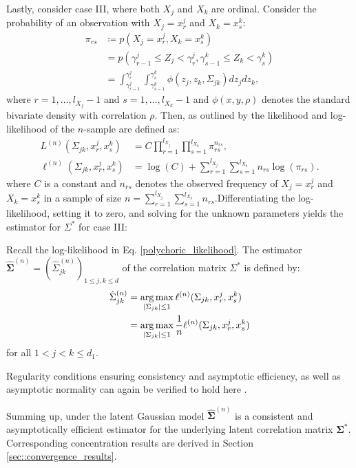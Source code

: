 Lastly, consider case III, where both $X_j$ and $X_k$ are ordinal. Consider the probability of an observation with $X_j = x_r^j$ and $X_k = x_s^k$:
\begin{equation}\label{cell_probabilities}
    \begin{split}
        \pi_{rs} &\coloneqq p(X_j = x_r^j, X_k = x_s^k) \\
        &= p(\gamma^j_{r-1} \leq Z_j < \gamma^j_r, \gamma^k_{s-1} \leq Z_k < \gamma^k_s) \\
        &= \int_{\gamma^j_{r-1}}^{\gamma^j_{r}} \int_{\gamma^k_{s-1}}^{\gamma^k_{s}} \phi(z_j,z_k,\Sigma_{jk}) dz_j dz_k,
    \end{split}
\end{equation}
where $r = 1, \dots, l_{X_j}-1$ and $s = 1, \dots, l_{X_k}-1$ and $\phi(x,y,\rho)$ denotes the standard bivariate density with correlation $\rho$. Then, as outlined by \citet{Olsson79} the likelihood and log-likelihood of the $n$-sample are defined as:
\begin{equation}\label{polychoric_likelihood}
    \begin{split}
        L^{(n)}(\Sigma_{jk}, x^j_r,x^k_s) &= C \prod_{r=1}^{l_{X_{j}}} \prod_{s=1}^{l_{X_{k}}} \pi_{rs}^{n_{rs}}, \\
        \ell^{(n)}(\Sigma_{jk}, x^j_r,x^k_s) &= \log(C) + \sum_{r=1}^{l_{X_{j}}}\sum_{s=1}^{l_{X_{k}}} n_{rs} \log(\pi_{rs}).  
    \end{split}
\end{equation}
where $C$ is a constant and $n_{rs}$ denotes the observed frequency of $X_j = x_r^j$ and $X_k = x_s^k$ in a sample of size $n= \sum_{r=1}^{l_{X_{j}}}\sum_{s=1}^{l_{X_{k}}} n_{rs}$.Differentiating the log-likelihood, setting it to zero, and solving for the unknown parameters yields the estimator for $\Sigma^*$ for case III:
\begin{definition}\label{definition_case3}
    Recall the log-likelihood in Eq. \eqref{polychoric_likelihood}. The estimator $\hat{\boldsymbol{\Sigma}}^{(n)} = (\hat{\Sigma}_{jk}^{(n)})_{1\leq j, k\leq d}$ of the correlation matrix $\Sigma^*$ is defined by:
    \begin{equation}
        \begin{split}
            \hat{\Sigma}_{jk}^{(n)} &= \argmax_{\Abs{\Sigma_{jk}} \leq 1} \ell^{(n)}(\Sigma_{jk}, x^j_r,x^k_s) \\
            &= \argmax_{\Abs{\Sigma_{jk}} \leq 1} \frac{1}{n} \ell^{(n)}(\Sigma_{jk}, x^j_r,x^k_s)
        \end{split}
    \end{equation}
    for all $1 < j < k \leq d_1 $. 
\end{definition}
\noindent Regularity conditions ensuring consistency and asymptotic efficiency, as well as asymptotic normality can again be verified to hold here \citep{Wallentin17}.

Summing up, under the latent Gaussian model $\hat{\boldsymbol{\Sigma}}^{(n)}$ is a consistent and asymptotically efficient estimator for the underlying latent correlation matrix $\boldsymbol{\Sigma}^{*}$. Corresponding concentration results are derived in Section \ref{sec::convergence_results}.  